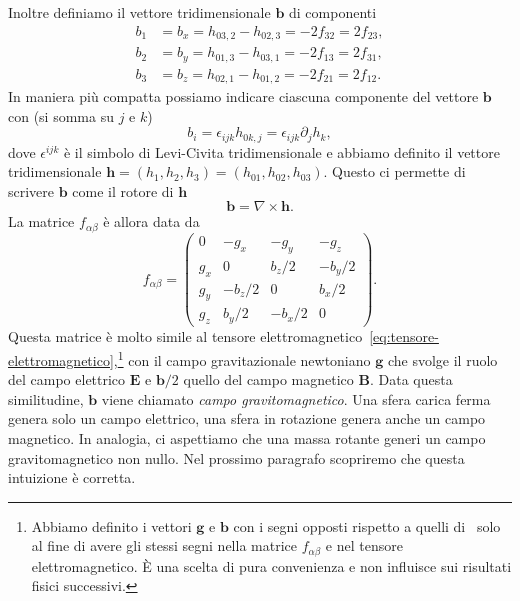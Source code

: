 Inoltre definiamo il vettore
tridimensionale $\bm{b}$ di componenti
\begin{subequations}
  \begin{align}
    b_{1} &= b_{x} = h_{03,2} - h_{02,3} = -2f_{32} = 2f_{23}, \\
    b_{2} &= b_{y} = h_{01,3} - h_{03,1} = -2f_{13} = 2f_{31}, \\
    b_{3} &= b_{z} = h_{02,1} - h_{01,2} = -2f_{21} = 2f_{12}.
  \end{align}
\end{subequations}
In maniera più compatta possiamo indicare ciascuna componente del vettore
$\bm{b}$ con (si somma su $j$ e $k$)
\begin{equation}
  b_{i} = \epsilon_{ijk}h_{0k,j} = \epsilon_{ijk}\partial_{j}h_{k},
\end{equation}
dove $\epsilon^{ijk}$ è il simbolo di Levi-Civita tridimensionale e abbiamo
definito il vettore tridimensionale
$\bm{h} = (h_{1}, h_{2}, h_{3}) = (h_{01}, h_{02}, h_{03})$.  Questo ci permette
di scrivere $\bm{b}$ come il rotore di $\bm{h}$
\begin{equation}
  \bm{b} = \nabla \times \bm{h}.
\end{equation}
La matrice $f_{\alpha\beta}$ è allora data da
\begin{equation}
  f_{\alpha\beta} =
  \begin{pmatrix}
    0     & -g_{x}   & -g_{y}   & -g_{z}   \\
    g_{x} & 0        & b_{z}/2  & -b_{y}/2 \\
    g_{y} & -b_{z}/2 & 0        & b_{x}/2  \\
    g_{z} & b_{y}/2  & -b_{x}/2 & 0
  \end{pmatrix}.
\end{equation}
Questa matrice è molto simile al tensore
elettromagnetico~\eqref{eq:tensore-elettromagnetico},\footnote{Abbiamo definito
  i vettori $\bm{g}$ e $\bm{b}$ con i segni opposti rispetto a quelli
  di~\textcite[138-139]{ohanian:gravitazione} solo al fine di avere gli stessi
  segni nella matrice $f_{\alpha\beta}$ e nel tensore elettromagnetico.  È una
  scelta di pura convenienza e non influisce sui risultati fisici
  successivi.\label{nota-b}} con il campo gravitazionale newtoniano $\bm{g}$ che
svolge il ruolo del campo elettrico $\bm{E}$ e $\bm{b}/2$ quello del campo
magnetico $\bm{B}$.  Data questa similitudine, $\bm{b}$ viene chiamato
\emph{campo gravitomagnetico}.  Una sfera carica ferma genera solo un campo
elettrico, una sfera in rotazione genera anche un campo magnetico.  In analogia,
ci aspettiamo che una massa rotante generi un campo gravitomagnetico non nullo.
Nel prossimo paragrafo scopriremo che questa intuizione è corretta.

